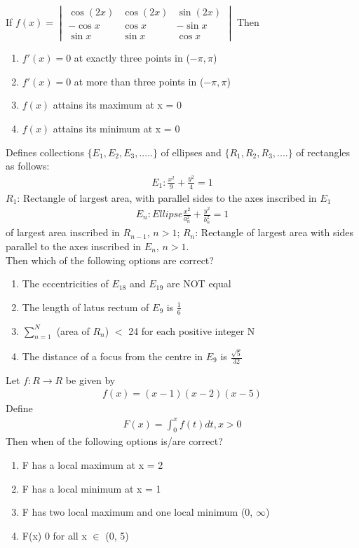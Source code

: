 \item If  
$f(x) = 
\begin{vmatrix}
\cos(2x) & \cos(2x) & \sin (2x) \\ 
-\cos x & \cos x & -\sin x  \\
\sin x & \sin x& \cos x 
\end{vmatrix}$
Then 
\begin{enumerate}
\item $f'(x) = 0$ at exactly three points in ($-\pi, \pi$)
\item $f'(x) = 0$ at more than three points in ($-\pi, \pi$)
\item $f(x)$ attains its maximum at x = 0
\item $f(x)$ attains its minimum at x = 0
\end{enumerate}

\item Defines collections $\{E_1, E_2, E_3,.....\}$ of ellipses and $\{R_1, R_2, R_3,....\}$ of rectangles as follows:
\begin{align}
E_1: 
\frac{x^2}{9} + \frac{y^2}{4} = 1
\end{align}
$R_1$: Rectangle of largest area, with parallel sides to the axes inscribed in $E_1$\\
\begin{align}
E_n: Ellipse \frac{x^2}{a_n^2} + \frac{y^2}{b_n^2} = 1
\end{align}
of largest area inscribed in $R_{n - 1}$, $n > 1$;
$R_n$: Rectangle of largest area with sides parallel to the axes inscribed in $E_n$, $n > 1$.\\
Then which of the following options are correct?
\begin{enumerate}
\item The eccentricities of $E_18$ and $E_19$ are NOT equal
\item The length of latus rectum of $E_9$ is $\frac{1}{6}$
\item $\sum_{n = 1}^N$ (area of $R_n$) $<$ 24 for each positive integer N
\item The distance of a focus from the centre in $E_9$ is $\frac{\sqrt{5}}{32}$
\end{enumerate}

\item Let $f: R \to R$ be given by 
\begin{align*}
f(x) = (x - 1)(x - 2)(x - 5)
\end{align*}
 Define 
\begin{align*}
F(x) = \int_{0}^{x} f(t)dt, x > 0
\end{align*} 
Then when of the following options is/are correct?
\begin{enumerate}
\item F has a local maximum at x = 2
\item F has a local minimum at x = 1
\item F has two local maximum and one local minimum (0, $\infty$)
\item F(x) 0 for all x $\in$ (0, 5) 
\end{enumerate}

